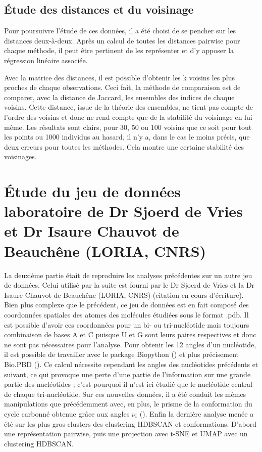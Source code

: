 \documentclass[a4paper,12pt]{article}
\begin{document}
\subsection{Étude des distances et du voisinage}
Pour poursuivre l'étude de ces données, il a été choisi de se pencher sur les distances deux-à-deux. Après un calcul de toutes les distances pairwise pour chaque méthode, il peut être pertinent de les représenter et d'y apposer la régression linéaire associée.

Avec la matrice des distances, il est possible d'obtenir les k voisins les plus proches de chaque observations. Ceci fait, la méthode de comparaison est de comparer, avec la distance de Jaccard, les ensembles des indices de chaque voisins. Cette distance, issue de la théorie des ensembles, ne tient pas compte de l'ordre des voisins et donc ne rend compte que de la stabilité du voisinage en lui même. Les résultats sont clairs, pour 30, 50 ou 100 voisins que ce soit pour tout les points ou 1000 individus au hasard, il n'y a, dans le cas le moins précis, que deux erreurs pour toutes les méthodes. Cela montre une certaine stabilité des voisinages.

\section{Étude du jeu de données laboratoire de Dr Sjoerd de Vries et Dr Isaure Chauvot de Beauchêne (LORIA, CNRS)}

La deuxième partie était de reproduire les analyses précédentes sur un autre jeu de données. Celui utilisé par la suite est fourni par le Dr Sjoerd de Vries et la Dr Isaure Chauvot de Beauchêne (LORIA, CNRS) (citation en cours d'écriture). Bien plus complexe que le précédent, ce jeu de données est en fait composé des coordonnées spatiales des atomes des molécules étudiées sous le format .pdb. Il est possible d'avoir ces coordonnées pour un bi- ou tri-nucléotide mais toujours combinaison de bases A et C puisque U et G sont leurs paires respectives et donc ne sont pas nécessaires pour l'analyse. Pour obtenir les 12 angles d'un nucléotide, il est possible de travailler avec le package Biopython (\cite{cockBiopythonFreelyAvailable2009}) et plus précisement Bio.PBD (\cite{hamelryckPDBFileParser2003}). Ce calcul nécessite cependant les angles des nucléotides précédents et suivant, ce qui provoque une perte d'une partie de l'information sur une grande partie des nucléotides ; c'est pourquoi il n'est ici étudié que le nucléotide central de chaque tri-nucléotide. Sur ces nouvelles données, il a été conduit les mêmes manipulations que précédemment avec, en plus, le prisme de la conformation du cycle carbonné obtenue grâce aux angles $\nu_i$ (\cite{raoExactMethodCalculation1981}).
Enfin la dernière analyse menée a été sur les plus gros clusters des clustering HDBSCAN et conformations. D'abord une représentation pairwise, puis une projection avec t-SNE et UMAP avec un clustering HDBSCAN.
\end{document}
